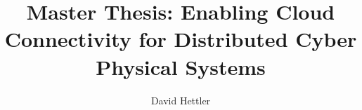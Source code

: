 \documentclass{lni}
\author{David Hettler}
\title{Master Thesis: Enabling Cloud Connectivity for Distributed Cyber Physical Systems}
\begin{document}
\maketitle






\tableofcontents

\pagebreak









\pagebreak

\end{document}
